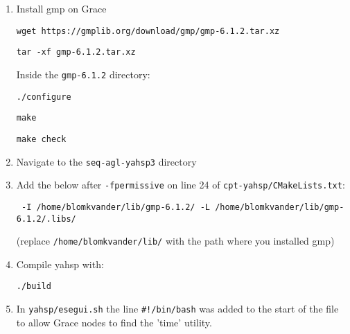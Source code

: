 \documentclass{article}
\begin{document}
\begin{enumerate}

  \item Install gmp on Grace

  \texttt{wget https://gmplib.org/download/gmp/gmp-6.1.2.tar.xz}

  \texttt{tar -xf gmp-6.1.2.tar.xz}

  Inside the \texttt{gmp-6.1.2} directory:

  \texttt{./configure}

  \texttt{make}

  \texttt{make check}

  \item Navigate to the \texttt{seq-agl-yahsp3} directory

  \item Add the below after \texttt{-fpermissive} on line 24 of \texttt{cpt-yahsp/CMakeLists.txt}:

  \texttt{ -I /home/blomkvander/lib/gmp-6.1.2/ -L /home/blomkvander/lib/gmp-6.1.2/.libs/}

  (replace \texttt{/home/blomkvander/lib/} with the path where you installed gmp)

  \item Compile yahsp with:

  \texttt{./build}

  \item In \texttt{yahsp/esegui.sh} the line \texttt{\#!/bin/bash} was added to the start of the file to allow Grace nodes to find the 'time' utility.

\end{enumerate}
\end{document}
